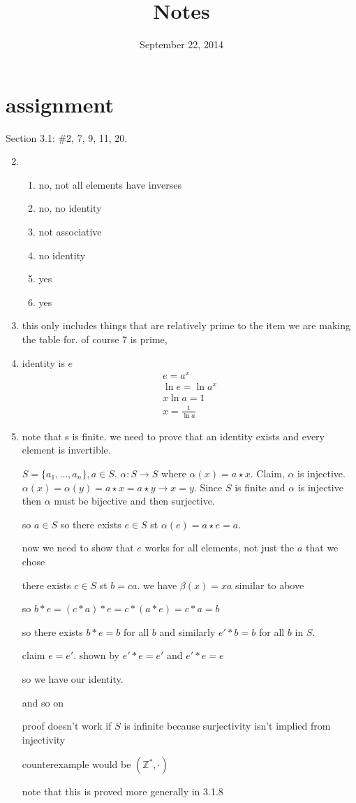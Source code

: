 \documentclass[letterpaper]{article}
\begin{document}
\title{Notes}
\date{September 22, 2014}
\maketitle
\section*{assignment}
Section 3.1: \#2, 7, 9, 11, 20.
\begin{enumerate}
\setcounter{enumi}{1}
\item
\begin{enumerate}
\item
no, not all elements have inverses
\item
no, no identity
\item
not associative
\item
no identity
\item
yes
\item
yes
\end{enumerate}
\setcounter{enumi}{6}
\item
this only includes things that are relatively prime to the item we are making the table for. of course 7 is prime, 
\setcounter{enumi}{8}
\item
identity is $e$
\begin{align*}
  e=a^x\\
  \ln e=\ln a^x\\
  x\ln a=1\\
  x=\frac{1}{\ln a}
\end{align*}
\setcounter{enumi}{19}
\item
note that s is finite. we need to prove that an identity exists and every element is invertible.

$S=\{a_1,\dots,a_n\}, a\in S$. $\alpha:S\to S$ where $\alpha(x)=a\star x$. Claim, $\alpha$ is injective.$\alpha(x)=\alpha(y)=a\star x=a\star y\to x=y$. Since $S$ is finite and $\alpha$ is injective then $\alpha$ must be bijective and then surjective.

so $a\in S$ so there exists $e\in S$ st $\alpha(e)=a\star e=a$.

now we need to show that $e$ works for all elements, not just the $a$ that we chose

there exists $c\in S$ st $b=ca$. we have $\beta(x)=xa$ similar to above

so $b*e=(c*a)*e=c*(a*e)=c*a=b$

so there exists $b*e=b$ for all $b$ and similarly $e'*b=b$ for all $b$ in $S$.

claim $e=e'$. shown by $e'*e=e'$ and $e'*e=e$

so we have our identity.

and so on

proof doesn't work if $S$ is infinite because surjectivity isn't implied from injectivity

counterexample would be $(\mathbb{Z}^*,\cdot)$

note that this is proved more generally in 3.1.8
\end{enumerate}
\end{document}
